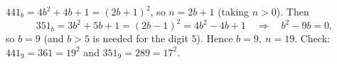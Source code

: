 $441_b=4b^2+4b+1=(2b+1)^2$, so $n=2b+1$ (taking $n>0$). Then
\[
351_b=3b^2+5b+1=(2b-1)^2=4b^2-4b+1\quad\Longrightarrow\quad b^2-9b=0,
\]
so $b=9$ (and $b>5$ is needed for the digit $5$). Hence $\boxed{b=9,\ n=19}$. Check: $441_9=361=19^2$ and $351_9=289=17^2$.
